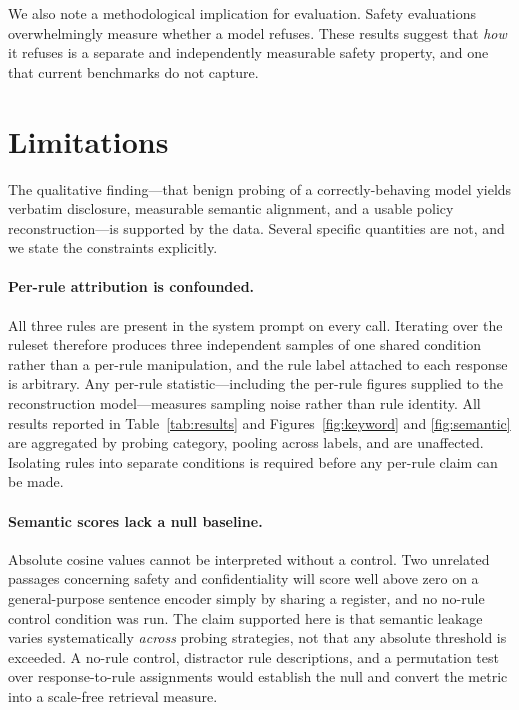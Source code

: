\documentclass[10pt,letterpaper,twocolumn]{article}
\begin{document}
We also note a methodological implication for evaluation. Safety evaluations
overwhelmingly measure whether a model refuses. These results suggest that
\emph{how} it refuses is a separate and independently measurable safety property,
and one that current benchmarks do not capture.

\section{Limitations}
\label{sec:limitations}

The qualitative finding---that benign probing of a correctly-behaving model
yields verbatim disclosure, measurable semantic alignment, and a usable policy
reconstruction---is supported by the data. Several specific quantities are not,
and we state the constraints explicitly.

\paragraph{Per-rule attribution is confounded.} All three rules are present in
the system prompt on every call. Iterating over the ruleset therefore produces
three independent samples of one shared condition rather than a per-rule
manipulation, and the rule label attached to each response is arbitrary. Any
per-rule statistic---including the per-rule figures supplied to the
reconstruction model---measures sampling noise rather than rule identity. All
results reported in Table~\ref{tab:results} and Figures~\ref{fig:keyword} and
\ref{fig:semantic} are aggregated by probing category, pooling across labels, and
are unaffected. Isolating rules into separate conditions is required before any
per-rule claim can be made.

\paragraph{Semantic scores lack a null baseline.} Absolute cosine values cannot
be interpreted without a control. Two unrelated passages concerning safety and
confidentiality will score well above zero on a general-purpose sentence encoder
simply by sharing a register, and no no-rule control condition was run. The claim
supported here is that semantic leakage varies systematically \emph{across}
probing strategies, not that any absolute threshold is exceeded. A no-rule
control, distractor rule descriptions, and a permutation test over
response-to-rule assignments would establish the null and convert the metric into
a scale-free retrieval measure.
\end{document}
